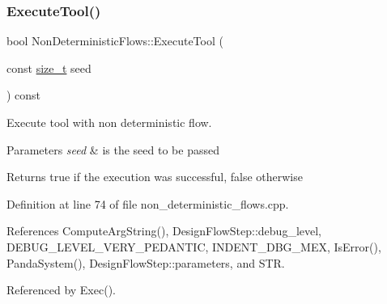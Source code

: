\subsubsection{\texorpdfstring{Execute\+Tool()}{ExecuteTool()}}
{\footnotesize\ttfamily bool Non\+Deterministic\+Flows\+::\+Execute\+Tool (\begin{DoxyParamCaption}\item[{const \hyperlink{tutorial__fpt__2017_2intro_2sixth_2test_8c_a7c94ea6f8948649f8d181ae55911eeaf}{size\+\_\+t}}]{seed }\end{DoxyParamCaption}) const\hspace{0.3cm}{\ttfamily [private]}}



Execute tool with non deterministic flow. 


\begin{DoxyParams}{Parameters}
{\em seed} & is the seed to be passed \\
\hline
\end{DoxyParams}
\begin{DoxyReturn}{Returns}
true if the execution was successful, false otherwise 
\end{DoxyReturn}


Definition at line 74 of file non\+\_\+deterministic\+\_\+flows.\+cpp.



References Compute\+Arg\+String(), Design\+Flow\+Step\+::debug\+\_\+level, D\+E\+B\+U\+G\+\_\+\+L\+E\+V\+E\+L\+\_\+\+V\+E\+R\+Y\+\_\+\+P\+E\+D\+A\+N\+T\+IC, I\+N\+D\+E\+N\+T\+\_\+\+D\+B\+G\+\_\+\+M\+EX, Is\+Error(), Panda\+System(), Design\+Flow\+Step\+::parameters, and S\+TR.



Referenced by Exec().

